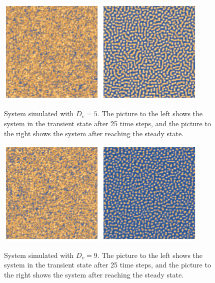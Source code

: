 \begin{figure}[h]
    \centering
    \includegraphics[width=0.45\textwidth]{img/2bd5transient.png}
    \includegraphics[width=0.45\textwidth]{img/2bd5.png}
  \caption{System simulated with $D_v=5$. The picture to the left shows the system in the transient state after 25 time steps, and the picture to the right shows the system after reaching the steady state.}
\end{figure}

\begin{figure}[h]
    \centering
    \includegraphics[width=0.45\textwidth]{img/2bd9transient.png}
    \includegraphics[width=0.45\textwidth]{img/2bd9.png}
  \caption{System simulated with $D_v=9$. The picture to the left shows the system in the transient state after 25 time steps, and the picture to the right shows the system after reaching the steady state.}
\end{figure}
